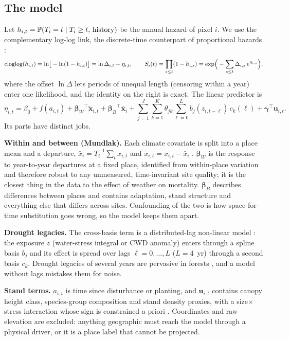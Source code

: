 \subsection{The model}
Let $h_{i,t}=\mathbb{P}(T_i=t\mid T_i\ge t,\,\text{history})$ be the annual hazard of pixel $i$. We use the complementary log-log link, the discrete-time counterpart of proportional hazards \citep{Prentice1978,Singer2003}:
\begin{equation}\label{eq:cloglog}
\operatorname{cloglog}(h_{i,t})=\ln\!\big[-\ln(1-h_{i,t})\big]=\ln\Delta_{i,t}+\eta_{i,t},\qquad S_i(t)=\prod_{s\le t}(1-h_{i,s})=\exp\!\Big(-\sum_{s\le t}\Delta_{i,s}\,e^{\eta_{i,s}}\Big),
\end{equation}
where the offset $\ln\Delta$ lets periods of unequal length (censoring within a year) enter one likelihood, and the identity on the right is exact. The linear predictor is
\begin{equation}\label{eq:eta}
\eta_{i,t}=\beta_0+f(a_{i,t})+{\bm\beta_W}^{\!\top}\tilde{\bm x}_{i,t}+{\bm\beta_B}^{\!\top}\bar{\bm x}_i+\sum_{j=1}^{J}\sum_{k=1}^{K}\theta_{jk}\sum_{\ell=0}^{L}b_j(z_{i,t-\ell})\,c_k(\ell)+\bm\gamma^{\top}\bm u_{i,t}.
\end{equation}
Its parts have distinct jobs.

\textbf{Within and between (Mundlak).} Each climate covariate is split into a place mean and a departure, $\bar x_{i}=T_i^{-1}\sum_t x_{i,t}$ and $\tilde x_{i,t}=x_{i,t}-\bar x_i$ \citep{Mundlak1978,Bell2015}. $\bm\beta_W$ is the response to year-to-year departures at a fixed place, identified from within-place variation and therefore robust to any unmeasured, time-invariant site quality; it is the closest thing in the data to the effect of weather on mortality. $\bm\beta_B$ describes differences between places and contains adaptation, stand structure and everything else that differs across sites. Confounding of the two is how space-for-time substitution goes wrong, so the model keeps them apart.

\textbf{Drought legacies.} The cross-basis term is a distributed-lag non-linear model \citep{Gasparrini2010}: the exposure $z$ (water-stress integral or CWD anomaly) enters through a spline basis $b_j$ and its effect is spread over lags $\ell=0,\dots,L$ ($L=4$~yr) through a second basis $c_k$. Drought legacies of several years are pervasive in forests \citep{Anderegg2015}, and a model without lags mistakes them for noise.

\textbf{Stand terms.} $a_{i,t}$ is time since disturbance or planting, and $\bm u_{i,t}$ contains canopy height class, species-group composition and stand density proxies, with a size$\times$stress interaction whose sign is constrained a priori \citep{Bennett2015}. Coordinates and raw elevation are excluded: anything geographic must reach the model through a physical driver, or it is a place label that cannot be projected.

